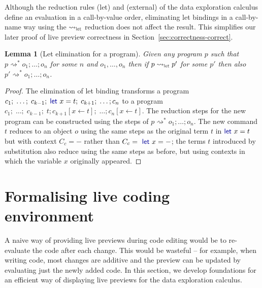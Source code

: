 \documentclass[acmsmall,anonymous,fleqn]{acmart}\settopmatter{printfolios=false,printccs=false,printacmref=false}
\newcounter{thc}
\theoremstyle{plain}
\newtheorem{lem}[thc]{Lemma}
\theoremstyle{definition}
\newcommand{\ident}[1]{\textnormal{\textcolor{idclr}{\sffamily #1}}}
\newcommand{\kvd}[1]{\textnormal{\textcolor{kvdclr}{\sffamily #1}}}
\newcommand{\rname}[1]{{\sffamily\small(#1)}}
\begin{document}
\noindent
Although the reduction rules \rname{let} and \rname{external} of the data exploration calculus
define an evaluation in a call-by-value order, eliminating let bindings in a call-by-name way
using the $\rightsquigarrow_\ident{let}$ reduction does not affect the result. This
simplifies our later proof of live preview correctness in Section~\ref{sec:correctness-correct}.

\begin{lem}[Let elimination for a program]
\label{thm:let-lang-elimination}
Given any program $p$ such that $p \rightsquigarrow^{*} o_1;\ldots;o_n$ for some $n$ and $o_1, \ldots, o_n$
then if $p \rightsquigarrow_\ident{let} p'$ for some $p'$ then also $p' \rightsquigarrow^{*} o_1;\ldots;o_n$.
\end{lem}
\begin{proof}
The elimination of let binding transforms a program $c_1;\; \ldots;\; c_{k-1};\; \kvd{let}~x=t;\; c_{k+1};\; \ldots; c_n$
to a program $c_1;\; \ldots;\; c_{k-1};\; t; c_{k+1}[x\leftarrow t];\; \ldots; c_n[x\leftarrow t]$.
The reduction steps for the new program can be constructed using the steps of $p \rightsquigarrow^{*} o_1;\ldots;o_n$.
The new command $t$ reduces to an object $o$ using the same steps as the original term $t$
in $\kvd{let}~x=t$ but with context $C_c = -$ rather than $C_c = \kvd{let}~x=-$; the terms $t$
introduced by substitution also reduce using the same steps as before, but using
contexts in which the variable $x$ originally appeared.
\end{proof}

\newpage


\section{Formalising live coding environment}
\label{sec:formal}

A naive way of providing live previews during code editing would be to re-evaluate the code
after each change. This would be wasteful -- for example, when writing
code, most changes are additive and the preview can be updated by evaluating just the newly added
code. In this section, we develop foundations for an efficient way of displaying live previews
for the data exploration calculus.

\end{document}
